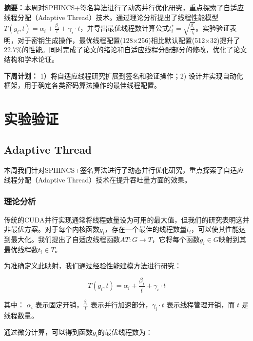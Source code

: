 \documentclass[report]{../../custom}
\begin{document}
\maketitle

\noindent \textbf{摘要：}本周对SPHINCS+签名算法进行了动态并行优化研究，重点探索了自适应线程分配（Adaptive Thread）技术。通过理论分析提出了线程性能模型$T(g_i, t) = \alpha_i + \frac{\beta_i}{t} + \gamma_i \cdot t$，并导出最优线程数计算公式$t_i^* = \sqrt{\frac{\beta_i}{\gamma_i}}$。实验验证表明，对于密钥生成操作，最优线程配置(128×256)相比默认配置(512×32)提升了22.7\%的性能。同时完成了论文的绪论和自适应线程分配部分的修改，优化了论文结构和学术论证。

\vskip 0.5cm

\noindent \textbf{下周计划：} 1）将自适应线程研究扩展到签名和验证操作；2) 设计并实现自动化框架，用于确定各类密码算法操作的最佳线程配置。

\section{实验验证}

\subsection{Adaptive Thread}

本周我们针对SPHINCS+签名算法进行了动态并行优化研究，重点探索了自适应线程分配（Adaptive Thread）技术在提升吞吐量方面的效果。

\subsubsection{理论分析}

传统的CUDA并行实现通常将线程数量设为可用的最大值，但我们的研究表明这并非最优方案。对于每个内核函数$g_i$，存在一个最佳的线程数量$t_i$，可以使其性能达到最大化。我们提出了自适应线程函数$AT:G\rightarrow T$，它将每个函数$g_i \in G$映射到其最优线程数$t_i \in T$。

为准确定义此映射，我们通过经验性能建模方法进行研究：

\begin{equation}
T(g_i, t) = \alpha_i + \frac{\beta_i}{t} + \gamma_i \cdot t
\end{equation}

其中：
$\alpha_i$ 表示固定开销，$\frac{\beta_i}{t}$ 表示并行加速部分，$\gamma_i \cdot t$ 表示线程管理开销，而 $t$ 是线程数量。

通过微分计算，可以得到函数$g_i$的最优线程数为：
\end{document}
